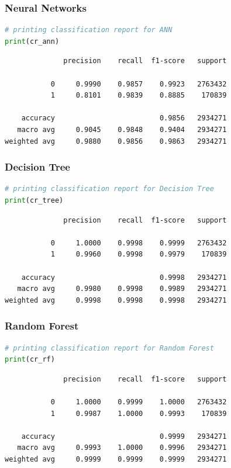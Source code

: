 \documentclass{article}
\begin{document}
\subsubsection{Neural Networks}
\begin{lstlisting}[language=Python]
# printing classification report for ANN
print(cr_ann)
\end{lstlisting}
\begin{verbatim}    
              precision    recall  f1-score   support

           0     0.9990    0.9857    0.9923   2763432
           1     0.8101    0.9839    0.8885    170839

    accuracy                         0.9856   2934271
   macro avg     0.9045    0.9848    0.9404   2934271
weighted avg     0.9880    0.9856    0.9863   2934271
\end{verbatim}

\subsubsection{Decision Tree}
\begin{lstlisting}[language=Python]
# printing classification report for Decision Tree
print(cr_tree)
\end{lstlisting}
\begin{verbatim}
              precision    recall  f1-score   support

           0     1.0000    0.9998    0.9999   2763432
           1     0.9960    0.9998    0.9979    170839

    accuracy                         0.9998   2934271
   macro avg     0.9980    0.9998    0.9989   2934271
weighted avg     0.9998    0.9998    0.9998   2934271
\end{verbatim}

\subsubsection{Random Forest}
\begin{lstlisting}[language=Python]
# printing classification report for Random Forest
print(cr_rf)
\end{lstlisting}
\begin{verbatim}   
              precision    recall  f1-score   support

           0     1.0000    0.9999    1.0000   2763432
           1     0.9987    1.0000    0.9993    170839

    accuracy                         0.9999   2934271
   macro avg     0.9993    1.0000    0.9996   2934271
weighted avg     0.9999    0.9999    0.9999   2934271
\end{verbatim}
\end{document}
